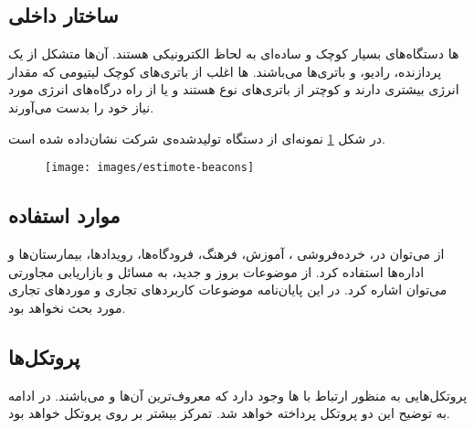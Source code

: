 \documentclass[oneside]{report}
\begin{document}
 \subsection{ساختار داخلی {\small {}}}
		{\normalsize {}}ها 
		دستگاه‌های بسیار کوچک و ساده‌ای به لحاظ الکترونیکی هستند. آن‌ها متشکل از یک پردازنده، رادیو، و باتری‌ها می‌باشند.  
		{\normalsize {}}ها 
		اغلب از باتری‌های کوچک لیتیومی 
 که مقدار انرژی بیشتری دارند و کوچتر از باتری‌های نوع 
                {\normalsize {}} 
 هستند و یا از راه درگاه‌های 
                {\normalsize {}} 
 انرژی مورد نیاز خود را بدست می‌آورند. 

در شکل 
\ref{fig:estimote-beacons}
نمونه‌ای از دستگاه
{\normalsize {}} 
تولید‌شده‌ی شرکت
{\normalsize {}} 
نشان‌داده شده است.

\begin{figure}[h]
	\label{beacon}
	\centering
	\texttt{[image: images/estimote-beacons]}
	\caption{{\footnotesize {}} }
	\label{fig:estimote-beacons}
\end{figure}


 
 \subsection{موارد استفاده}
 
 از 
                {\normalsize {}} 
                می‌توان  در، خرده‌فروشی 
                ،  آموزش، فرهنگ، فرودگاه‌ها، رویدادها، بیمارستان‌ها و اداره‌ها  استفاده کرد. از موضوعات بروز و جدید،  به مسائل  
                               {\normalsize {}} 
            و    بازاریابی مجاورتی
                می‌توان اشاره کرد‌.
            در این پایان‌نامه    موضوعات کاربردهای تجاری و  مورد‌های تجاری 
                {\normalsize {}} 
                مورد بحث نخواهد بود.
                
   \subsection{پروتکل‌ها}
		
		پروتکل‌هایی به منظور ارتباط با 
		{\normalsize {}} ها
		وجود دارد که معروف‌ترین آن‌ها 
		{\normalsize {}} 
		و
		{\normalsize {}}                    
		می‌باشند. در ادامه به توضیح این دو پروتکل پرداخته خواهد شد.  تمرکز بیشتر بر روی پروتکل 
				{\normalsize {}} 
				خواهد بود.
\end{document}
